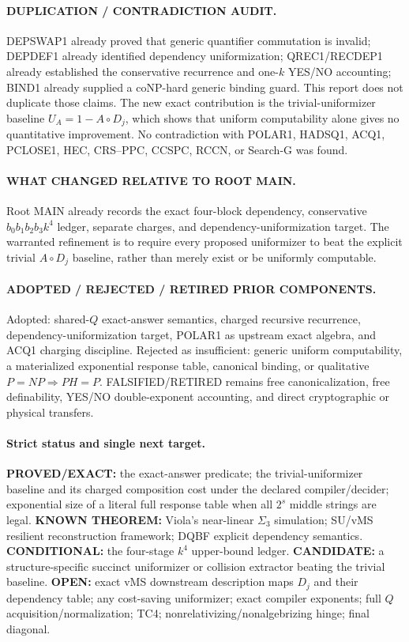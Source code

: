 \documentclass[11pt]{article}
\begin{document}
\paragraph{DUPLICATION / CONTRADICTION AUDIT.}
DEPSWAP1 already proved that generic quantifier commutation is invalid; DEPDEF1 already identified dependency uniformization; QREC1/RECDEP1 already established the conservative recurrence and one-$k$ YES/NO accounting; BIND1 already supplied a coNP-hard generic binding guard. This report does not duplicate those claims. The new exact contribution is the trivial-uniformizer baseline $U_A=1-A\circ D_j$, which shows that uniform computability alone gives no quantitative improvement. No contradiction with POLAR1, HADSQ1, ACQ1, PCLOSE1, HEC, CRS--PPC, CCSPC, RCCN, or Search-G was found.

\paragraph{WHAT CHANGED RELATIVE TO ROOT MAIN.}
Root MAIN already records the exact four-block dependency, conservative $b_0b_1b_2b_3k^4$ ledger, separate charges, and dependency-uniformization target. The warranted refinement is to require every proposed uniformizer to beat the explicit trivial $A\circ D_j$ baseline, rather than merely exist or be uniformly computable.

\paragraph{ADOPTED / REJECTED / RETIRED PRIOR COMPONENTS.}
Adopted: shared-$Q$ exact-answer semantics, charged recursive recurrence, dependency-uniformization target, POLAR1 as upstream exact algebra, and ACQ1 charging discipline. Rejected as insufficient: generic uniform computability, a materialized exponential response table, canonical binding, or qualitative $P=NP\Rightarrow PH=P$. FALSIFIED/RETIRED remains free canonicalization, free definability, YES/NO double-exponent accounting, and direct cryptographic or physical transfers.

\paragraph{Strict status and single next target.}
\textbf{PROVED/EXACT:} the exact-answer predicate; the trivial-uniformizer baseline and its charged composition cost under the declared compiler/decider; exponential size of a literal full response table when all $2^s$ middle strings are legal. \textbf{KNOWN THEOREM:} Viola's near-linear $\Sigma_3$ simulation; SU/vMS resilient reconstruction framework; DQBF explicit dependency semantics. \textbf{CONDITIONAL:} the four-stage $k^4$ upper-bound ledger. \textbf{CANDIDATE:} a structure-specific succinct uniformizer or collision extractor beating the trivial baseline. \textbf{OPEN:} exact vMS downstream description maps $D_j$ and their dependency table; any cost-saving uniformizer; exact compiler exponents; full $Q$ acquisition/normalization; TC4; nonrelativizing/nonalgebrizing hinge; final diagonal.
\end{document}
